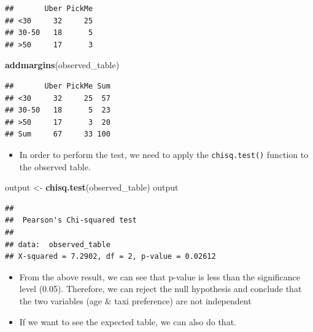 \documentclass[]{book}
\newenvironment{Shaded}{\begin{snugshade}}{\end{snugshade}}
\newcommand{\KeywordTok}[1]{\textcolor[rgb]{0.13,0.29,0.53}{\textbf{#1}}}
\newcommand{\NormalTok}[1]{#1}
\newcommand{\OperatorTok}[1]{\textcolor[rgb]{0.81,0.36,0.00}{\textbf{#1}}}
\newcommand{\StringTok}[1]{\textcolor[rgb]{0.31,0.60,0.02}{#1}}
\providecommand{\tightlist}{%
  \setlength{\itemsep}{0pt}\setlength{\parskip}{0pt}}
\begin{document}
\begin{verbatim}
##       Uber PickMe
## <30     32     25
## 30-50   18      5
## >50     17      3
\end{verbatim}

\begin{Shaded}
\begin{Highlighting}[]
\KeywordTok{addmargins}\NormalTok{(observed_table)}
\end{Highlighting}
\end{Shaded}

\begin{verbatim}
##       Uber PickMe Sum
## <30     32     25  57
## 30-50   18      5  23
## >50     17      3  20
## Sum     67     33 100
\end{verbatim}

\begin{itemize}
\tightlist
\item
  In order to perform the test, we need to apply the \texttt{chisq.test()} function to the observed table.
\end{itemize}

\begin{Shaded}
\begin{Highlighting}[]
\NormalTok{output <-}\StringTok{ }\KeywordTok{chisq.test}\NormalTok{(observed_table)}
\NormalTok{output}
\end{Highlighting}
\end{Shaded}

\begin{verbatim}
## 
##  Pearson's Chi-squared test
## 
## data:  observed_table
## X-squared = 7.2902, df = 2, p-value = 0.02612
\end{verbatim}

\begin{itemize}
\item
  From the above result, we can see that p-value is less than the significance level (0.05). Therefore, we can reject the null hypothesis and conclude that the two variables (age \& taxi preference) are not independent
\item
  If we want to see the expected table, we can also do that.
\end{itemize}

\begin{Shaded}
\end{Shaded}
\end{document}
